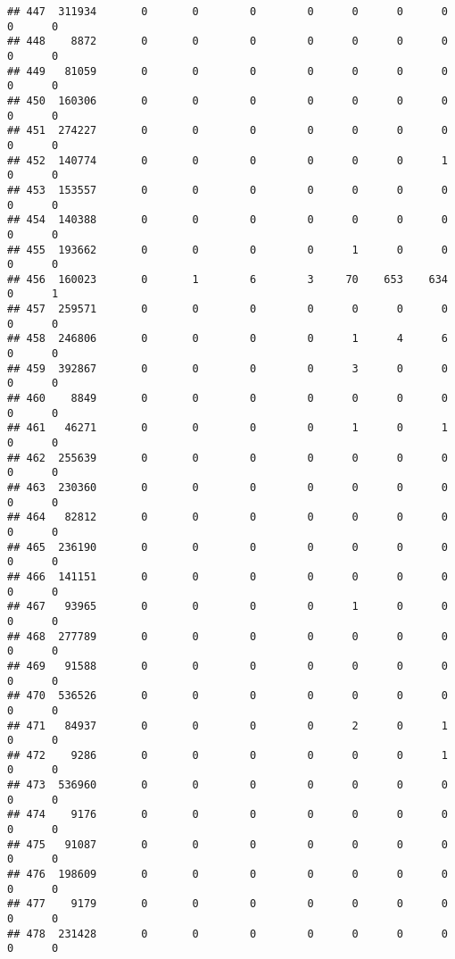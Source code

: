 \documentclass[
]{article}
\begin{document}
\begin{verbatim}
## 447  311934       0       0        0        0      0      0      0     0      0
## 448    8872       0       0        0        0      0      0      0     0      0
## 449   81059       0       0        0        0      0      0      0     0      0
## 450  160306       0       0        0        0      0      0      0     0      0
## 451  274227       0       0        0        0      0      0      0     0      0
## 452  140774       0       0        0        0      0      0      1     0      0
## 453  153557       0       0        0        0      0      0      0     0      0
## 454  140388       0       0        0        0      0      0      0     0      0
## 455  193662       0       0        0        0      1      0      0     0      0
## 456  160023       0       1        6        3     70    653    634     0      1
## 457  259571       0       0        0        0      0      0      0     0      0
## 458  246806       0       0        0        0      1      4      6     0      0
## 459  392867       0       0        0        0      3      0      0     0      0
## 460    8849       0       0        0        0      0      0      0     0      0
## 461   46271       0       0        0        0      1      0      1     0      0
## 462  255639       0       0        0        0      0      0      0     0      0
## 463  230360       0       0        0        0      0      0      0     0      0
## 464   82812       0       0        0        0      0      0      0     0      0
## 465  236190       0       0        0        0      0      0      0     0      0
## 466  141151       0       0        0        0      0      0      0     0      0
## 467   93965       0       0        0        0      1      0      0     0      0
## 468  277789       0       0        0        0      0      0      0     0      0
## 469   91588       0       0        0        0      0      0      0     0      0
## 470  536526       0       0        0        0      0      0      0     0      0
## 471   84937       0       0        0        0      2      0      1     0      0
## 472    9286       0       0        0        0      0      0      1     0      0
## 473  536960       0       0        0        0      0      0      0     0      0
## 474    9176       0       0        0        0      0      0      0     0      0
## 475   91087       0       0        0        0      0      0      0     0      0
## 476  198609       0       0        0        0      0      0      0     0      0
## 477    9179       0       0        0        0      0      0      0     0      0
## 478  231428       0       0        0        0      0      0      0     0      0

\end{verbatim}
\end{document}
